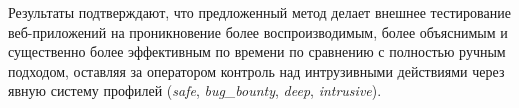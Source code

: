 \begin{SingleSpace}
Результаты подтверждают, что предложенный метод делает внешнее тестирование веб-приложений на проникновение более воспроизводимым, более объяснимым и существенно более эффективным по времени по сравнению с полностью ручным подходом, оставляя за оператором контроль над интрузивными действиями через явную систему профилей (\textit{safe}, \textit{bug\_bounty}, \textit{deep}, \textit{intrusive}).

\par{}
\end{SingleSpace}
\clearpage
